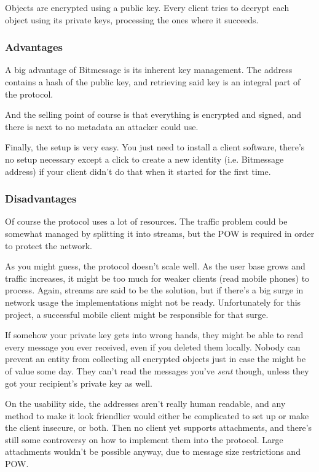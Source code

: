 \documentclass{bfh}
\begin{document}
  Objects are encrypted using a public key. Every client tries to decrypt each object using its private keys, processing the ones where it succeeds.

  \subsubsection{Advantages}
  A big advantage of Bitmessage is its inherent key management. The address contains a hash of the public key, and retrieving said key is an integral part of the protocol.

  And the selling point of course is that everything is encrypted and signed, and there is next to no metadata an attacker could use.

  Finally, the setup is very easy. You just need to install a client software, there's no setup necessary except a click to create a new identity (i.e. Bitmessage address) if your client didn't do that when it started for the first time.

  \subsubsection{Disadvantages}
  Of course the protocol uses a lot of resources. The traffic problem could be somewhat managed by splitting it into streams\cite{wiki:stream}, but the \ac{POW} is required in order to protect the network.

  As you might guess, the protocol doesn't scale well. As the user base grows and traffic increases, it might be too much for weaker clients (read mobile phones) to process. Again, streams are said to be the solution, but if there's a big surge in network usage the implementations might not be ready. Unfortunately for this project, a successful mobile client might be responsible for that surge.

  If somehow your private key gets into wrong hands, they might be able to read every message you ever received, even if you deleted them locally. Nobody can prevent an entity from collecting all encrypted objects just in case the might be of value some day. They can't read the messages you've \textit{sent} though, unless they got your recipient's private key as well.

  On the usability side, the addresses aren't really human readable, and any method to make it look friendlier would either be complicated to set up or make the client insecure, or both. Then no client yet supports attachments, and there's still some controversy on how to implement them into the protocol. Large attachments wouldn't be possible anyway, due to message size restrictions and \ac{POW}.
\end{document}
